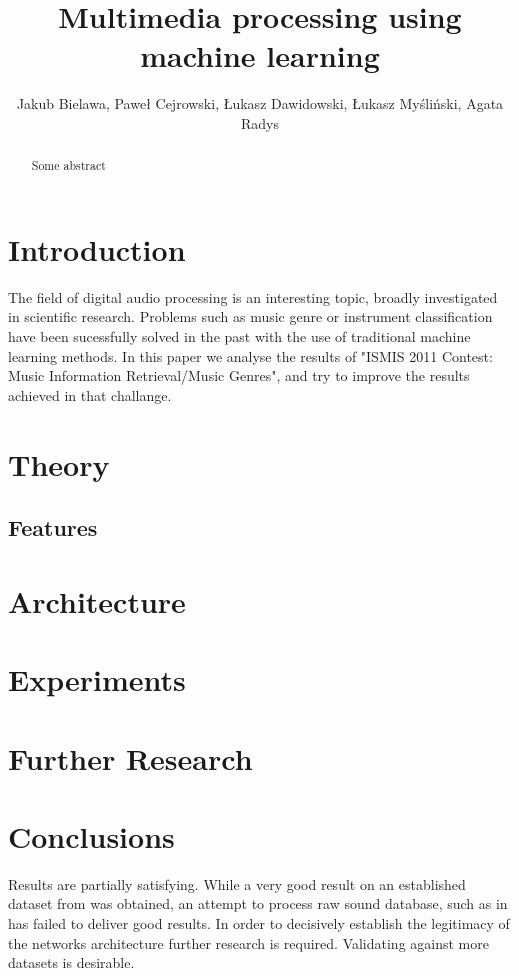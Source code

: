 \documentclass[journal, a4paper]{IEEEtran}
\begin{document}
	\title{Multimedia processing using machine learning}
	\author{Jakub Bielawa, Paweł Cejrowski, Łukasz Dawidowski, Łukasz Myśliński, Agata Radys}
	\maketitle

\begin{abstract}
Some abstract
\end{abstract}

\section{Introduction}
The field of digital audio processing is an interesting topic, broadly investigated in scientific research. Problems such as music genre or instrument classification have been sucessfully solved in the past with the use of traditional machine learning methods. In this paper we analyse the results of "ISMIS 2011 Contest: Music Information Retrieval/Music Genres", and try to improve the results achieved in that challange. 
\section{Theory}


\subsection{Features}



\section{Architecture}


	
\section{Experiments}


\section{Further Research}


\section{Conclusions}

Results are partially satisfying. While a very good result on an established dataset from \cite{data} was obtained, an attempt to process raw sound database, such as in \cite{gztan} has failed to deliver good results. In order to decisively establish the legitimacy of the networks architecture further research is required. Validating against more datasets is desirable.

{}

\end{document}
